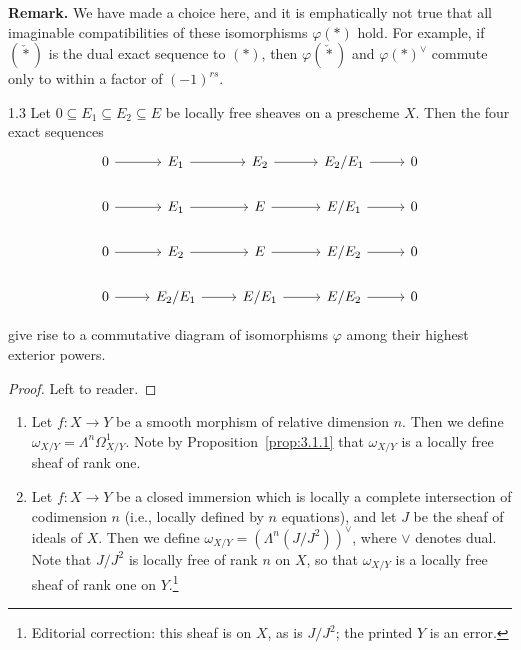 \textbf{Remark.}
We have made a choice here, and it is emphatically not true that all imaginable compatibilities of these isomorphisms $\varphi(*)$ hold. For example, if $(\check{*})$ is the dual exact sequence to $(*)$, then $\varphi(\check{*})$ and $\varphi(*)^{\vee}$ commute only to within a factor of $(-1)^{rs}$.

\begin{booklemma}{1.3}\label{lem:3.1.3}
Let $0\subseteq E_1\subseteq E_2\subseteq E$ be locally free sheaves on a prescheme $X$. Then the four exact sequences
\[
\begin{tikzcd}[row sep=1.5em, column sep=2.5em]
	0 \arrow[r] & E_1 \arrow[r] & E_2 \arrow[r] & E_2/E_1 \arrow[r] & 0 \\
	0 \arrow[r] & E_1 \arrow[r] & E \arrow[r] & E/E_1 \arrow[r] & 0 \\
	0 \arrow[r] & E_2 \arrow[r] & E \arrow[r] & E/E_2 \arrow[r] & 0 \\
	0 \arrow[r] & E_2/E_1 \arrow[r] & E/E_1 \arrow[r] & E/E_2 \arrow[r] & 0
\end{tikzcd}
\]

 give rise to a commutative diagram of isomorphisms $\varphi$ among their highest exterior powers.
\end{booklemma}

\begin{proof}
Left to reader.
\end{proof}

\begin{definition*}
\begin{enumerate}
\item[a)] Let $f\colon X\to Y$ be a smooth morphism of relative dimension $n$. Then we define $\omega_{X/Y}=\Lambda^n\Omega^1_{X/Y}$. Note by Proposition~\ref{prop:3.1.1} that $\omega_{X/Y}$ is a locally free sheaf of rank one.
\item[b)] Let $f\colon X\to Y$ be a closed immersion which is locally a complete intersection of codimension $n$ (i.e., locally defined by $n$ equations), and let $J$ be the sheaf of ideals of $X$. Then we define $\omega_{X/Y}=(\Lambda^n(J/J^2))^{\vee}$, where $\vee$ denotes dual. Note that $J/J^2$ is locally free of rank $n$ on $X$, so that $\omega_{X/Y}$ is a locally free sheaf of rank one on $Y$.\footnote{Editorial correction: this sheaf is on $X$, as is $J/J^2$; the printed $Y$ is an error.}
\end{enumerate}
\end{definition*}

